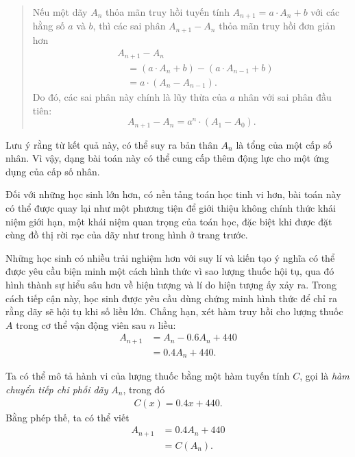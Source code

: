 {\begin{description}
      \begin{quotation}
        Nếu một dãy $A_n$ thỏa mãn truy hồi tuyến tính $A_{n+1}=a\cdot A_n+b$ với các hằng số $a$ và $b$, thì các sai phân $A_{n+1}-A_n$ thỏa mãn truy hồi đơn giản hơn
        \begin{align*}
          &A_{n+1}-A_n \\
          &\quad =(a\cdot A_n+b)-(a\cdot A_{n-1}+b) \\
          &\quad =a\cdot (A_n-A_{n-1}).
        \end{align*}
        Do đó, các sai phân này chính là lũy thừa của $a$ nhân với sai phân đầu tiên:
        $$
        A_{n+1}-A_n
          =a^n\cdot (A_1-A_0).
        $$
      \end{quotation}

      Lưu ý rằng từ kết quả này, có thể suy ra bản thân $A_n$ là tổng của một cấp số nhân. Vì vậy, dạng bài toán này có thể cung cấp thêm động lực cho một ứng dụng của cấp số nhân.

      \item[Phương pháp 4.] Đối với những học sinh lớn hơn, có nền tảng toán học tinh vi hơn, bài toán này có thể được quay lại như một phương tiện để giới thiệu không chính thức khái niệm giới hạn, một khái niệm quan trọng của toán học, đặc biệt khi được đặt cùng đồ thị rời rạc của dãy như trong hình ở trang trước.

      \item[Phương pháp 5.] Những học sinh có nhiều trải nghiệm hơn với suy lí và kiến tạo ý nghĩa có thể được yêu cầu biện minh một cách hình thức vì sao lượng thuốc hội tụ, qua đó hình thành sự hiểu sâu hơn về hiện tượng và lí do hiện tượng ấy xảy ra. Trong cách tiếp cận này, học sinh được yêu cầu dùng chứng minh hình thức để chỉ ra rằng dãy sẽ hội tụ khi số liều lớn. Chẳng hạn, xét hàm truy hồi cho lượng thuốc $A$ trong cơ thể vận động viên sau $n$ liều:\vspace{\baselineskip}
      \begin{align*}
        A_{n+1}
          &=A_n-0.6A_n+440 \\
          &=0.4A_n+440. \tag{1}
      \end{align*}

      Ta có thể mô tả hành vi của lượng thuốc bằng một hàm tuyến tính $C$, gọi là \emph{hàm chuyển tiếp chi phối dãy} $A_n$, trong đó\vspace{\baselineskip}
        \begin{align*}
          C(x)=0.4x+440. \tag{2}
        \end{align*}
      Bằng phép thế, ta có thể viết
      \begin{align*}
        A_{n+1}
          &=0.4A_n+440 \\
          &=C(A_n). \tag{3}
      \end{align*}


\end{description}}
